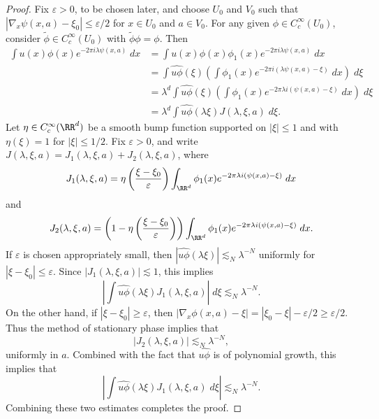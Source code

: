 \begin{proof}
    Fix $\varepsilon > 0$, to be chosen later, and choose $U_0$ and $V_0$ such that $|\nabla_x \psi(x,a) - \xi_0| \leq \varepsilon/2$ for $x \in U_0$ and $a \in V_0$. For any given $\phi \in C_c^\infty(U_0)$, consider $\tilde{\phi} \in C_c^\infty(U_0)$ with $\tilde{\phi} \phi = \phi$. Then
    \begin{align*}
        \int u(x) \phi(x) e^{-2 \pi i \lambda \psi(x,a)}\; dx &= \int u(x) \phi(x) \phi_1(x) e^{-2 \pi i \lambda \psi(x,a)}\; dx\\
        &= \int \widehat{u \phi}(\xi) \left( \int \phi_1(x) e^{-2 \pi i (\lambda \psi(x,a) - \xi)}\; dx \right)\; d\xi\\
        &= \lambda^d \int \widehat{u \phi}(\xi) \left( \int \phi_1(x) e^{-2 \pi \lambda i(\psi(x,a) - \xi)}\; dx \right)\; d\xi\\
        &= \lambda^d \int \widehat{u \phi}(\lambda \xi) J(\lambda,\xi,a)\; d\xi.
    \end{align*}
    Let $\eta \in C_c^\infty(\RR^d)$ be a smooth bump function supported on $|\xi| \leq 1$ and with $\eta(\xi) = 1$ for $|\xi| \leq 1/2$. Fix $\varepsilon > 0$, and write $J(\lambda,\xi,a) = J_1(\lambda,\xi,a) + J_2(\lambda,\xi,a)$, where
    \[ J_1(\lambda,\xi,a) = \eta \left( \frac{\xi - \xi_0}{\varepsilon} \right) \int_{\RR^d} \phi_1(x) e^{-2 \pi \lambda i(\psi(x,a) - \xi)}\; dx \]
    and
    \[ J_2(\lambda,\xi,a) = \left(1 - \eta \left( \frac{\xi - \xi_0}{\varepsilon} \right) \right) \int_{\RR^d} \phi_1(x) e^{-2 \pi \lambda i (\psi(x,a) - \xi)}\; dx. \]
    If $\varepsilon$ is chosen appropriately small, then $|\widehat{u \phi}(\lambda \xi)| \lesssim_N \lambda^{-N}$ uniformly for $|\xi - \xi_0| \leq \varepsilon$. Since $|J_1(\lambda,\xi,a)| \lesssim 1$, this implies
    \[ \left| \int \widehat{u \phi}(\lambda \xi) J_1(\lambda,\xi,a) \right|\; d\xi \lesssim_N \lambda^{-N}. \]
    On the other hand, if $|\xi - \xi_0| \geq \varepsilon$, then $|\nabla_x \phi(x,a) - \xi| = |\xi_0 - \xi| - \varepsilon/2 \geq \varepsilon/2$. Thus the method of stationary phase implies that
    \[ |J_2(\lambda,\xi,a)| \lesssim_N \lambda^{-N}, \]
    uniformly in $a$. Combined with the fact that $\widehat{u \phi}$ is of polynomial growth, this implies that
    \[ \left| \int \widehat{u \phi}(\lambda \xi) J_1(\lambda,\xi,a)\; d\xi \right| \lesssim_N \lambda^{-N}. \]
    Combining these two estimates completes the proof.
\end{proof}

